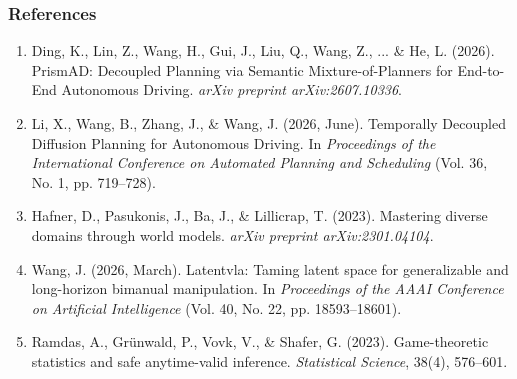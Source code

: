 \begin{frame}
  \frametitle{References}
  \begin{enumerate}
    \item[\hypertarget{ref:19}{[19]}] Ding, K., Lin, Z., Wang, H., Gui, J., Liu, Q., Wang, Z., ... \& He, L. (2026). PrismAD: Decoupled Planning via Semantic Mixture-of-Planners for End-to-End Autonomous Driving. \textit{arXiv preprint arXiv:2607.10336}.
    \item[\hypertarget{ref:20}{[20]}] Li, X., Wang, B., Zhang, J., \& Wang, J. (2026, June). Temporally Decoupled Diffusion Planning for Autonomous Driving. In \textit{Proceedings of the International Conference on Automated Planning and Scheduling} (Vol. 36, No. 1, pp. 719--728).
    \item[\hypertarget{ref:21}{[21]}] Hafner, D., Pasukonis, J., Ba, J., \& Lillicrap, T. (2023). Mastering diverse domains through world models. \textit{arXiv preprint arXiv:2301.04104}.
    \item[\hypertarget{ref:22}{[22]}] Wang, J. (2026, March). Latentvla: Taming latent space for generalizable and long-horizon bimanual manipulation. In \textit{Proceedings of the AAAI Conference on Artificial Intelligence} (Vol. 40, No. 22, pp. 18593--18601).
    \item[\hypertarget{ref:23}{[23]}] Ramdas, A., Gr\"unwald, P., Vovk, V., \& Shafer, G. (2023). Game-theoretic statistics and safe anytime-valid inference. \textit{Statistical Science}, 38(4), 576--601.
  \end{enumerate}
\end{frame}
